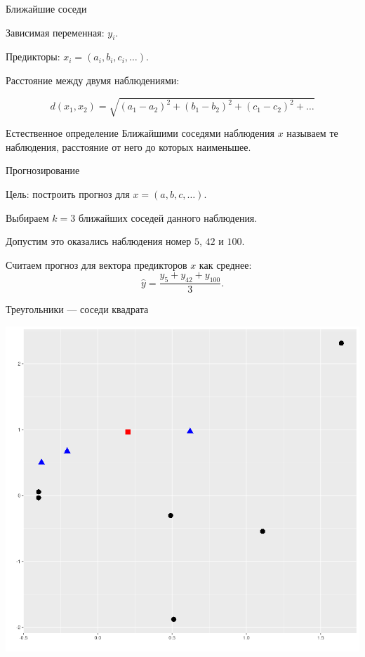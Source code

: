 \begin{frame}{Ближайшие соседи}

Зависимая переменная: $y_i$.

Предикторы: $x_i = (a_i, b_i, c_i, \ldots)$.
\pause

Расстояние между двумя наблюдениями:

\[
d(x_1, x_2) = \sqrt{(a_1 - a_2)^2 + (b_1 - b_2)^2 + (c_1 - c_2)^2 + \ldots}  
\]
\pause

\begin{block}{Естественное определение}
  \alert{Ближайшими соседями} наблюдения $x$ называем те наблюдения, расстояние от него до которых наименьшее. 
\end{block}

\end{frame}

\begin{frame}{Прогнозирование}

\alert{Цель}: построить прогноз для $x = (a, b, c, \ldots)$.

\pause

Выбираем $k = 3$ ближайших соседей данного наблюдения. 

\pause 

Допустим это оказались наблюдения номер $5$, $42$ и $100$.

\pause

Считаем прогноз для вектора предикторов $x$ как среднее:
\[
\hat y = \frac{y_5 + y_{42} + y_{100}}{3}.
\]
\end{frame}

\begin{frame}{Треугольники — соседи квадрата}

\begin{center}
\includegraphics[scale=0.8]{figures/knn.png}
\end{center}

\end{frame}

